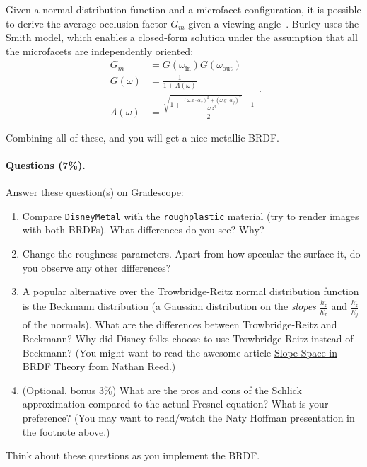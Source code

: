 Given a normal distribution function and a microfacet configuration, it is possible to derive the average occlusion factor $G_m$ given a viewing angle~\cite{Heitz:2014:UMF}. Burley uses the Smith model, which enables a closed-form solution under the assumption that all the microfacets are independently oriented:
\begin{equation}
\begin{aligned}
G_m &= G(\omega_{\text{in}}) G(\omega_{\text{out}}) \\
G(\omega) &= \frac{1}{1 + \Lambda(\omega)} \\
\Lambda(\omega) &= \frac{\sqrt{1 + \frac{\left(\omega.x \cdot \alpha_x\right)^2 + \left(\omega.y \cdot \alpha_y\right)^2}{\omega.z^2}} - 1}{2}
\end{aligned}.
\end{equation}

Combining all of these, and you will get a nice metallic BRDF.

\paragraph{Questions (7\%).} Answer these question(s) on Gradescope:
\begin{enumerate}
    \item Compare \lstinline{DisneyMetal} with the \lstinline{roughplastic} material (try to render images with both BRDFs). What differences do you see? Why?
    \item Change the roughness parameters. Apart from how specular the surface it, do you observe any other differences?
    \item A popular alternative over the Trowbridge-Reitz normal distribution function is the Beckmann distribution (a Gaussian distribution on the \emph{slopes} $\frac{h_z^l}{h_x^l}$ and $\frac{h_z^l}{h_y^l}$ of the normals). What are the differences between Trowbridge-Reitz and Beckmann? Why did Disney folks choose to use Trowbridge-Reitz instead of Beckmann? (You might want to read the awesome article \href{https://www.reedbeta.com/blog/slope-space-in-brdf-theory/}{Slope Space in BRDF Theory} from Nathan Reed.)
    \item (Optional, bonus 3\%) What are the pros and cons of the Schlick approximation compared to the actual Fresnel equation? What is your preference? (You may want to read/watch the Naty Hoffman presentation in the footnote above.)
\end{enumerate}
Think about these questions as you implement the BRDF.

